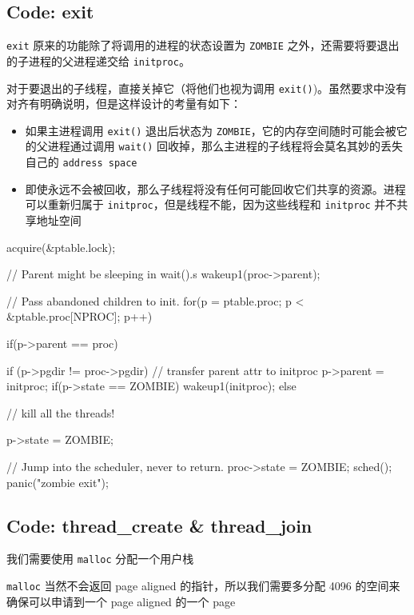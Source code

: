 \subsection{Code: exit}

\texttt{exit} 原来的功能除了将调用的进程的状态设置为 \texttt{ZOMBIE} 之外，还需要将要退出的子进程的父进程递交给 \texttt{initproc}。

对于要退出的子线程，直接关掉它（将他们也视为调用 \texttt{exit()})。虽然要求中没有对齐有明确说明，但是这样设计的考量有如下：

\begin{itemize}
    \item 如果主进程调用 \texttt{exit()} 退出后状态为 \texttt{ZOMBIE}，它的内存空间随时可能会被它的父进程通过调用 \texttt{wait()} 回收掉，那么主进程的子线程将会莫名其妙的丢失自己的 \texttt{address space}
    \item 即使永远不会被回收，那么子线程将没有任何可能回收它们共享的资源。进程可以重新归属于 \texttt{initproc}，但是线程不能，因为这些线程和 \texttt{initproc} 并不共享地址空间
\end{itemize}

\begin{ccode}
    acquire(&ptable.lock);
            
    // Parent might be sleeping in wait().s
    wakeup1(proc->parent);
            
    // Pass abandoned children to init.
    for(p = ptable.proc; p < &ptable.proc[NPROC]; p++){
        if(p->parent == proc){
            if (p->pgdir != proc->pgdir) {
                // transfer parent attr to initproc
                p->parent = initproc;
                if(p->state == ZOMBIE)
                wakeup1(initproc);
                } else {
                // kill all the threads!
                                                        
                p->state = ZOMBIE;
            }
        }
    }
            
    // Jump into the scheduler, never to return.
    proc->state = ZOMBIE;
    sched();
    panic("zombie exit");
\end{ccode}


\subsection{Code: thread\_create \& thread\_join}

我们需要使用 \texttt{malloc} 分配一个用户栈

\texttt{malloc} 当然不会返回 page aligned 的指针，所以我们需要多分配 4096 的空间来确保可以申请到一个 page aligned 的一个 page

